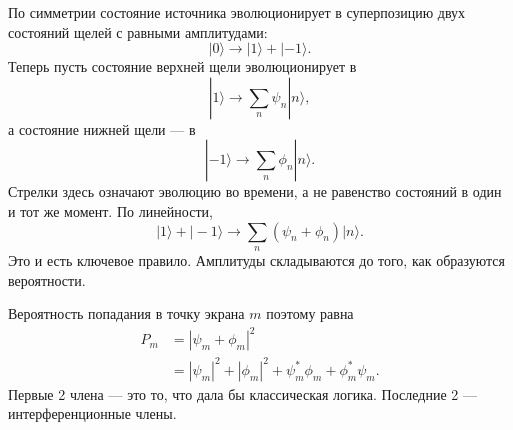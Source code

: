 По симметрии состояние источника эволюционирует в суперпозицию двух состояний щелей с равными амплитудами:
\begin{equation}
|0\rangle \longrightarrow |1\rangle+|-1\rangle.
\end{equation}
Теперь пусть состояние верхней щели эволюционирует в
\begin{equation}
|1\rangle \longrightarrow \sum_n \psi_n |n\rangle,
\end{equation}
а состояние нижней щели — в
\begin{equation}
|-1\rangle \longrightarrow \sum_n \phi_n |n\rangle.
\end{equation}
Стрелки здесь означают эволюцию во времени, а не равенство состояний в один и тот же момент. По линейности,
\begin{equation}
|1\rangle+|-1\rangle \longrightarrow \sum_n (\psi_n+\phi_n)|n\rangle.
\end{equation}
Это и есть ключевое правило. Амплитуды складываются до того, как образуются вероятности.

\begin{classroomqa}
\end{classroomqa}

\begin{classroomqa}
\end{classroomqa}

Вероятность попадания в точку экрана \(m\) поэтому равна
\begin{align}
P_m &= |\psi_m+\phi_m|^2 \\
    &= |\psi_m|^2 + |\phi_m|^2 + \psi_m^*\phi_m + \phi_m^*\psi_m.
\end{align}
Первые 2 члена — это то, что дала бы классическая логика. Последние 2 — интерференционные члены.

